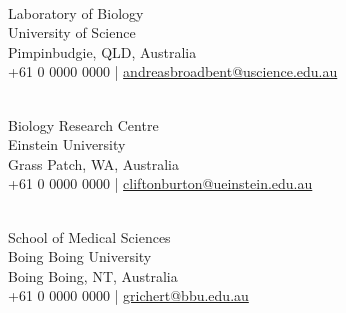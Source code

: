 




\begin{cvletter}
	\singlespacing
	\\
	\fontsize{9pt}{1em}\bodyfontlight\upshape\color{graytext}
	Laboratory of Biology \\
	University of Science \\
	Pimpinbudgie, QLD, Australia\\
	\fontsize{6.8pt}{1em}\headerfont\color{text}
	\faMobile\acvHeaderIconSep +61 0 0000 0000 | \href{mailto:andreasbroadbent@uscience.edu.au}{\faEnvelope\acvHeaderIconSep andreasbroadbent@uscience.edu.au}
	
	\\
	\fontsize{9pt}{1em}\bodyfontlight\upshape\color{graytext}
	Biology Research Centre \\
	Einstein University \\
	Grass Patch, WA, Australia\\
	\fontsize{6.8pt}{1em}\headerfont\color{text}
	\faMobile\acvHeaderIconSep +61 0 0000 0000 | \href{mailto:cliftonburton@ueinstein.edu.au}{\faEnvelope\acvHeaderIconSep cliftonburton@ueinstein.edu.au}	
	
	\\
	\fontsize{9pt}{1em}\bodyfontlight\upshape\color{graytext}
	School of Medical Sciences \\
	Boing Boing University \\
	Boing Boing, NT, Australia\\
	\fontsize{6.8pt}{1em}\headerfont\color{text}
	\faMobile\acvHeaderIconSep +61 0 0000 0000 | \href{mailto:grichert@bbu.edu.au}{\faEnvelope\acvHeaderIconSep grichert@bbu.edu.au}
	
\end{cvletter}
